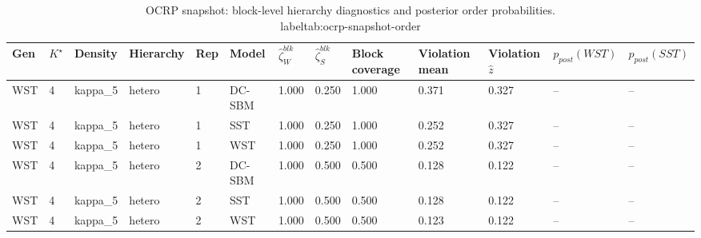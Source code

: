 \begin{table}[!h]
\centering
\caption{OCRP snapshot: block-level hierarchy diagnostics and posterior order probabilities.\\label{tab:ocrp-snapshot-order}}
\centering
\begin{tabular}[t]{lllllllllllll}
\toprule
Gen & $K^\star$ & Density & Hierarchy & Rep & Model & $\widehat\zeta_W^{blk}$ & $\widehat\zeta_S^{blk}$ & Block coverage & Violation mean & Violation $\hat z$ & $p_{post}(WST)$ & $p_{post}(SST)$\\
\midrule
WST & 4 & kappa_5 & hetero & 1 & DC-SBM & 1.000 & 0.250 & 1.000 & 0.371 & 0.327 & -- & --\\
WST & 4 & kappa_5 & hetero & 1 & SST & 1.000 & 0.250 & 1.000 & 0.252 & 0.327 & -- & --\\
WST & 4 & kappa_5 & hetero & 1 & WST & 1.000 & 0.250 & 1.000 & 0.252 & 0.327 & -- & --\\
WST & 4 & kappa_5 & hetero & 2 & DC-SBM & 1.000 & 0.500 & 0.500 & 0.128 & 0.122 & -- & --\\
WST & 4 & kappa_5 & hetero & 2 & SST & 1.000 & 0.500 & 0.500 & 0.128 & 0.122 & -- & --\\
WST & 4 & kappa_5 & hetero & 2 & WST & 1.000 & 0.500 & 0.500 & 0.123 & 0.122 & -- & --\\
\bottomrule
\end{tabular}
\end{table}
